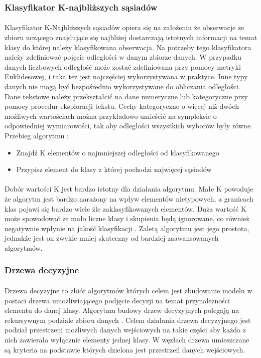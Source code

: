 \documentclass[a4paper,12pt,twoside]{article}
\begin{document}
\subsubsection{Klasyfikator K-najbliższych sąsiadów}
\paragraph{}
Klasyfikator K-Najbliższych sąsiadów opiera się na założeniu że obserwacje ze zbioru uczącego znajdujące się najbliżej dostarczają istotnych informacji na temat klasy do której należy klasyfikowana obserwacja. Na potrzeby tego klasyfikatora należy zdefiniować pojęcie odległości w danym zbiorze danych. W przypadku danych liczbowych odległość może zostać zdefiniowana przy pomocy metryki Euklidesowej, i taka tez jest najczęściej wykorzystywana w praktyce. Inne typy danych nie mogą być bezpośrednio wykorzystywane do obliczania odległości. Dane tekstowe należy przekształcić na dane numeryczne lub kategoryczne przy pomocy procedur eksploracji tekstu. Cechy kategoryczne o więcej niż dwóch możliwych wartościach można przykładowo umieścić na sympleksie o odpowiedniej wymiarowości, tak aby odległości wszystkich wyborów były równe. Przebieg algorytmu \cite{knn}:
\begin{itemize}
\item Znajdź K elementów o najmniejszej odległości od klasyfikowanego
\item Przypisz element do klasy z której pochodzi najwięcej sąsiadów
\end{itemize} 
\paragraph{}
Dobór wartości K jest bardzo istotny dla działania algorytmu. Małe K powoduje że algorytm jest bardzo narażony na wpływ elementów nietypowych, a granicach klas pojawi się bardzo wiele źle zaklasyfikowanych elementów.  Duża wartość K może spowodować że mało liczne klasy i skupienia będą ignorowane, co również negatywnie wpłynie na jakość klasyfikacji \cite{knn}. Zaletą algorytmu jest jego prostota, jednakże jest on zwykle mniej skuteczny od bardziej zaawansowanych algorytmów.
\newpage
\subsubsection{Drzewa decyzyjne}
\paragraph{}
Drzewa decyzyjne to zbiór algorytmów których celem jest zbudowanie modelu w postaci drzewa umożliwiającego podjęcie decyzji na temat przynależności elementu do danej klasy. Algorytmu budowy drzew decyzyjnych polegają na rekursywnym podziale zbioru danych \cite{tree}. Celem działania drzewa decyzyjnego jest podział przestrzeni możliwych danych wejściowych na takie części aby każda z nich zawierała wyłącznie elementy jednej klasy. W węzłach drzewa umieszczane są kryteria na podstawie których dzielona jest przestrzeń danych wejściowych. 
\end{document}

